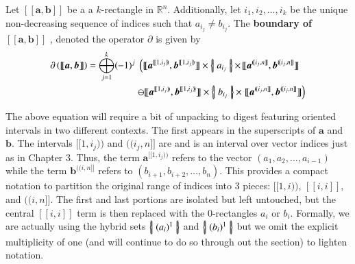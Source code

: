 \begin{definition}
	Let  $[\![\boldsymbol{a}, \boldsymbol{b}]\!]$ be a a $k$-rectangle in $\mathbb{R}^n$.
	Additionally, let $i_1, i_2, \ldots, i_k$ be the unique non-decreasing sequence of indices such that $a_{i_j} \neq b_{i_j}$.
	The \textbf{boundary of $ \boldsymbol{[\![ a,b ]\!]} $ }, denoted the operator $\partial$ is given by
	\begin{align}
		\partial \left( [\![ \boldsymbol{a}, \boldsymbol{b} ]\!] \right) 
		= \bigoplus_{j=1}^k (-1)^j \;
			\left(	
			[\![ \boldsymbol{a}^{[\![1,i_j)\!)}, \boldsymbol{b}^{[\![1,i_j)\!)} ]\!]
			\times \hset{a_{i_j}} \times \right. &
			[\![ \boldsymbol{a}^{(\!(i_j,n]\!]}, \boldsymbol{b}^{(\!(i_j,n]\!]} ]\!]  \notag\\
			\ominus
			[\![ \boldsymbol{a}^{[\![1,i_j)\!)}, \boldsymbol{b}^{[\![1,i_j)\!)} ]\!]
			\times \hset{b_{i_j}} \times & \left.
			[\![ \boldsymbol{a}^{(\!(i_j,n]\!]}, \boldsymbol{b}^{(\!(i_j,n]\!]} ]\!]
			\right)
	\end{align}
\end{definition}

The above equation will require a bit of unpacking to digest featuring oriented intervals in two different contexts.
The first appears in the superscripts of $\boldsymbol{a}$ and $\boldsymbol{b}$. 
The intervals $[\![1, i_j)\!)$ and $(\!(i_j, n]\!]$ are  and is an interval over vector indices just as in Chapter 3.
Thus, the term $\boldsymbol{a}^{[\![1,i_j)\!)}$ refers to the vector $(a_1, a_2, \ldots, a_{i-1})$ 
while the term $\boldsymbol{b}^{(\!(i,n]\!]}$ refers to $(b_{i+1}, b_{i+2}, \ldots, b_{n})$.
This provides a compact notation to partition the original range of indices into 3 pieces: $[\![ 1,i )\!)$, $[\![i, i]\!]$, and $(\!(i, n]\!]$.
The first and last portions are isolated but left untouched, 
but the central $[\![i,i]\!]$ term is then replaced with the 0-rectangles $a_i$ or $b_i$.
Formally, we are actually using the hybrid sets $\left\{ \! \left| \; (a_i)^1 \; \right| \! \right\}$ and $\left\{ \! \left| \; (b_i)^1 \; \right| \! \right\}$ but we omit the explicit multiplicity of one (and will continue to do so through out the section) to lighten notation.

